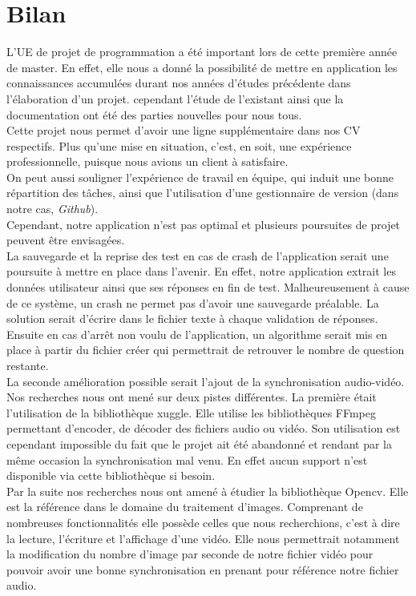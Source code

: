\chapter{Bilan}


L'UE de projet de programmation a été important lors de cette première année de master. En effet, elle nous a donné la possibilité de mettre en application les connaissances accumulées durant nos années d'études précédente dans l'élaboration d'un projet. cependant l'étude de l'existant ainsi que la documentation ont été des parties nouvelles pour nous tous.\\
Cette projet nous permet d'avoir une ligne supplémentaire dans nos CV respectifs. Plus qu'une mise en situation, c'est, en soit, une expérience professionnelle, puisque nous avions un client à satisfaire.\\
On peut aussi souligner l'expérience de travail en équipe, qui induit une bonne répartition des tâches, ainsi que l'utilisation d'une gestionnaire de version (dans notre cas, \textit{Github}).\\

Cependant, notre application n'est pas optimal et plusieurs poursuites de projet peuvent être envisagées.\\
La sauvegarde et la reprise des test en cas de crash de l'application serait une poursuite à mettre en place dans l'avenir. En effet, notre application extrait les données utilisateur ainsi que ses réponses en fin de test. Malheureusement à cause de ce système, un crash ne permet pas d'avoir une sauvegarde préalable. La solution serait d'écrire dans le fichier texte à chaque validation de réponses. Ensuite en cas d'arrêt non voulu de l'application, un algorithme serait mis en place à partir du fichier créer qui permettrait de retrouver le nombre de question restante.\\
La seconde amélioration possible serait l'ajout de la synchronisation audio-vidéo. Nos recherches nous ont mené sur deux pistes différentes. La première était l'utilisation de la bibliothèque xuggle. Elle utilise les bibliothèques FFmpeg permettant d'encoder, de décoder des fichiers audio ou vidéo. Son utilisation est cependant impossible du fait que le projet ait été abandonné et rendant par la même occasion la synchronisation mal venu. En effet aucun support n'est disponible via cette bibliothèque si besoin.\\
Par la suite nos recherches nous ont amené à étudier la bibliothèque Opencv. Elle est la référence dans le domaine du traitement d'images. Comprenant de nombreuses fonctionnalités elle possède celles que nous recherchions, c'est à dire la lecture, l'écriture et l'affichage d’une vidéo. Elle nous permettrait notamment la modification du nombre d'image par seconde de notre fichier vidéo pour pouvoir avoir une bonne synchronisation en prenant pour référence notre fichier audio.\\

